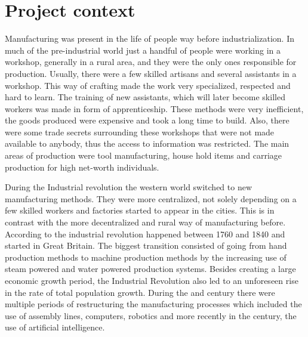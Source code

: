 \documentclass[12pt,a4paper,twoside]{report}
\begin{document}
\section{Project context}
Manufacturing was present in the life of people way before industrialization. In much of the pre-industrial world just a handful of people were working in a workshop, generally in a rural area, and they were the only ones responsible for production. Usually, there were a few skilled artisans and several assistants in a workshop. This way of crafting made the work very specialized, respected and hard to learn. The training of new assistants, which will later become skilled workers was made in form of apprenticeship. These methods were very inefficient, the goods produced were expensive and took a long time to build. Also, there were some trade secrets surrounding these workshops that were not made available to anybody, thus the access to information was restricted. The main areas of production were tool manufacturing, house hold items and carriage production for high net-worth individuals. \par
During the Industrial revolution the western world switched to new manufacturing methods. They were more centralized, not solely depending on a few skilled workers and factories started to appear in the cities. This is in contrast with the more decentralized and rural way of manufacturing before. According to \cite{article-industrial} the industrial revolution happened between 1760 and 1840 and started in Great Britain. The biggest transition consisted of going from hand production methods to machine production methods by the increasing use of steam powered and water powered production systems. Besides creating a large economic growth period, the Industrial Revolution also led to an unforeseen rise in the rate of total population growth. During the  and  century there were multiple periods of restructuring the manufacturing processes which included the use of assembly lines, computers, robotics and more recently in the  century, the use of artificial intelligence. \par
\end{document}
